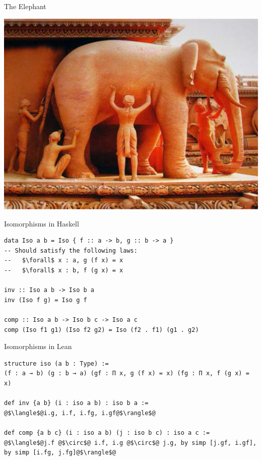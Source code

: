 \documentclass[pdf]{beamer}
\begin{document}
\begin{frame}{The Elephant}
  \begin{center}
    \includegraphics[scale=0.28]{images/elephant}
  \end{center}
\end{frame}

\begin{frame}[fragile]{Isomorphisms in Haskell}
  \begin{verbatim}
data Iso a b = Iso { f :: a -> b, g :: b -> a }
-- Should satisfy the following laws:
--   $\forall$ x : a, g (f x) = x
--   $\forall$ x : b, f (g x) = x

inv :: Iso a b -> Iso b a
inv (Iso f g) = Iso g f

comp :: Iso a b -> Iso b c -> Iso a c
comp (Iso f1 g1) (Iso f2 g2) = Iso (f2 . f1) (g1 . g2)
  \end{verbatim}
\end{frame}

\begin{frame}[fragile]{Isomorphisms in Lean}
  \begin{verbatim}
structure iso (a b : Type) :=
(f : a → b) (g : b → a) (gf : Π x, g (f x) = x) (fg : Π x, f (g x) = x)

def inv {a b} (i : iso a b) : iso b a :=
@$\langle$@i.g, i.f, i.fg, i.gf@$\rangle$@

def comp {a b c} (i : iso a b) (j : iso b c) : iso a c :=
@$\langle$@j.f @$\circ$@ i.f, i.g @$\circ$@ j.g, by simp [j.gf, i.gf], by simp [i.fg, j.fg]@$\rangle$@
  \end{verbatim}
\end{frame}
\end{document}

